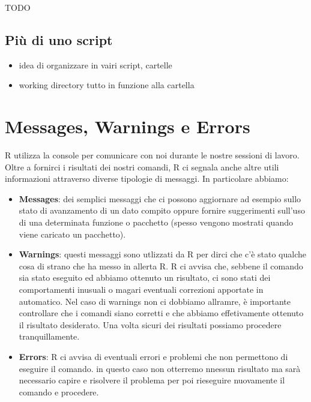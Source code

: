 \documentclass[
]{book}
\providecommand{\tightlist}{%
  \setlength{\itemsep}{0pt}\setlength{\parskip}{0pt}}
\begin{document}
TODO

\hypertarget{piuxf9-di-uno-script}{%
\subsection{Più di uno script}\label{piuxf9-di-uno-script}}

\begin{itemize}
\item
  idea di organizzare in vairi script, cartelle
\item
  working directory tutto in funzione alla cartella
\end{itemize}

\hypertarget{messages-warnings-e-errors}{%
\section{Messages, Warnings e Errors}\label{messages-warnings-e-errors}}

R utilizza la console per comunicare con noi durante le nostre sessioni di lavoro. Oltre a fornirci i risultati dei nostri comandi, R ci segnala anche altre utili informazioni attraverso diverse tipologie di messaggi. In particolare abbiamo:

\begin{itemize}
\tightlist
\item
  \textbf{Messages}: dei semplici messaggi che ci possono aggiornare ad esempio sullo stato di avanzamento di un dato compito oppure fornire suggerimenti sull'uso di una determinata funzione o pacchetto (spesso vengono mostrati quando viene caricato un pacchetto).
\item
  \textbf{Warnings}: questi messaggi sono utlizzati da R per dirci che c'è stato qualche cosa di strano che ha messo in allerta R. R ci avvisa che, sebbene il comando sia stato eseguito ed abbiamo ottenuto un risultato, ci sono stati dei comportamenti inusuali o magari eventuali correzioni apportate in automatico. Nel caso di warnings non ci dobbiamo allramre, è importante controllare che i comandi siano corretti e che abbiamo effetivamente ottenuto il risultato desiderato. Una volta sicuri dei risultati possiamo procedere tranquillamente.
\item
  \textbf{Errors}: R ci avvisa di eventuali errori e problemi che non permettono di eseguire il comando. in questo caso non otterremo nnessun risultato ma sarà necessario capire e risolvere il problema per poi rieseguire nuovamente il comando e procedere.
\end{itemize}
\end{document}
